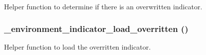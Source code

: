 \label{environment__indicator_8module_a982d48970210a65eb977a31d44882074}
Helper function to determine if there is an overwritten indicator. \hypertarget{environment__indicator_8module_a92d8ee8403b8c5fe64d074c0aca22ec0}{
\subsubsection[{\_\-environment\_\-indicator\_\-load\_\-overritten}]{\setlength{\rightskip}{0pt plus 5cm}\_\-environment\_\-indicator\_\-load\_\-overritten ()}}
\label{environment__indicator_8module_a92d8ee8403b8c5fe64d074c0aca22ec0}
Helper function to load the overritten indicator.

